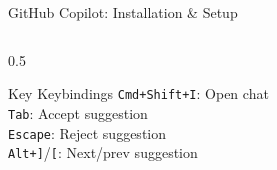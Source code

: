 \documentclass[aspectratio=169,11pt]{beamer}
\begin{document}
\begin{frame}{GitHub Copilot: Installation \& Setup}
\begin{columns}[T]
\begin{column}{0.5\textwidth}
            \begin{block}{Key Keybindings}
                \small
                \texttt{Cmd+Shift+I}: Open chat\\
                \texttt{Tab}: Accept suggestion\\
                \texttt{Escape}: Reject suggestion\\
                \texttt{Alt+]}/\texttt{[}: Next/prev suggestion
            \end{block}
        \end{column}
    \end{columns}

\end{frame}
\end{document}
